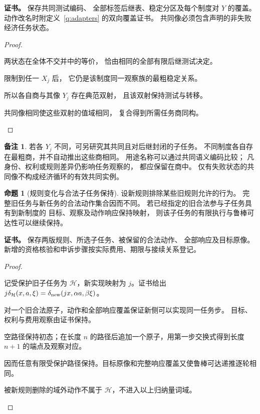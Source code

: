 \documentclass[UTF8,12pt,a4paper,openany,fontset=none,zihao=false]{ctexrep}
\theoremstyle{definition}
\newtheorem{proposition}{命题}[chapter]
\newtheorem{remark}{备注}[chapter]
\newenvironment{certificate}{\par\noindent\textbf{证书。}\ignorespaces}{\par}
\newcommand{\1}{\mathbf 1}
\begin{document}
\begin{certificate}
保存共同测试编码、
全部标签后继表、稳定分区及每个制度对 \(Y\) 的覆盖。
动作改名时附定义~\ref{q:adapters} 的双向覆盖证书。
共同像必须包含声明的非失败经济任务状态。
\end{certificate}
\begin{proof}
\begin{semanticsteps}
\item 两状态在全体不交并中的等价，
恰由相同的全部有限后继测试决定。
\item 限制到任一 \(X_j\) 后，
它仍是该制度同一观察族的最粗稳定关系。
\item 所以各自商与其像 \(Y_j\) 存在典范双射，
且该双射保持测试与转移。
\item 共同像相同使这些双射的值域相同，
复合得到所需任务商同构。
\end{semanticsteps}
\end{proof}
\begin{remark}
若各 \(Y_j\) 不同，可另研究其共同且对后继封闭的子任务。
不同制度各自存在最粗商，并不自动推出这些商相同。
用途名称可以通过共同语义编码比较；
凡身份、权利或规则差异仍影响任务观察的，
都应保留在商中。
仅有失败状态的共同像不构成经济循环的有效共同实例。
\end{remark}
\begin{proposition}[规则变化与合法子任务保持]
\label{q:rule-change}
设新规则排除某些旧规则允许的行为。
完整旧任务与新任务的合法动作集合因而不同。
若已经指定的旧合法参与子任务具有到新制度的
目标、观察及动作响应保持映射，
则该子任务的有限执行与鲁棒可达性可以继续保持。
\end{proposition}
\begin{certificate}
保存两版规则、所选子任务、被保留的合法动作、
全部响应及目标原像。
新增的资格核验和申诉步骤按实际费用、期限与接续关系登记。
\end{certificate}
\begin{proof}
\begin{semanticsteps}
\item 记受保护旧子任务为 \(\mathcal H\)，新实现映射为 \(j\)。证书给出
\(j\delta_{\mathcal H}(x,a,\xi)=\delta_{\rm new}(jx,\alpha a,\beta\xi)\)。
\item 对一个旧合法原子，动作和全部响应覆盖保证新侧可以实现同一任务步。
目标、权利与费用观察由证书保持。
\item 空路径保持初态；在长度 \(n\) 的路径后追加一个原子，用第一步交换式得到长度 \(n+1\) 的端点及观察对应。
\item 因而任意有限受保护路径保持。目标原像和完整响应覆盖又使鲁棒可达递推逐轮相同。
\item 被新规则删除的域外动作不属于 \(\mathcal H\)，不进入以上归纳量词域。
\end{semanticsteps}
\end{proof}
\end{document}
